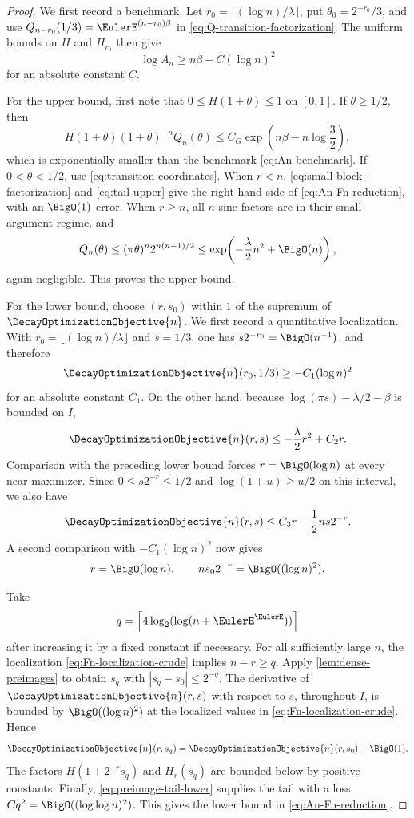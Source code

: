 \documentclass[11pt,oneside]{article}
\theoremstyle{definition}
\theoremstyle{remark}
\begin{document}
\begin{proof}
We first record a benchmark.  Let
\(r_0=\lfloor(\log n)/\lambda\rfloor\), put
\(\theta_0=2^{-r_0}/3\), and use
\(Q_{n-r_0}(1/3)=\EulerE^{(n-r_0)\beta}\) in
\eqref{eq:Q-transition-factorization}.  The uniform bounds on \(H\) and
\(H_{r_0}\) then give
\begin{equation}
 \log A_n\ge n\beta-C(\log n)^2
 \label{eq:An-benchmark}
\end{equation}
for an absolute constant \(C\).

For the upper bound, first note that \(0\le H(1+\theta)\le1\) on
\([0,1]\).  If \(\theta\ge1/2\), then
\[
 H(1+\theta)(1+\theta)^{-n}Q_n(\theta)
 \le C_G\exp\!\left(n\beta-n\log\frac32\right),
\]
which is exponentially smaller than the benchmark \eqref{eq:An-benchmark}.  If
\(0<\theta<1/2\), use \eqref{eq:transition-coordinates}.  When \(r<n\),
\eqref{eq:small-block-factorization} and \eqref{eq:tail-upper} give the
right-hand side of \eqref{eq:An-Fn-reduction}, with an \(\BigO(1)\) error.
When \(r\ge n\), all \(n\) sine factors are in their small-argument regime,
and
\[
 Q_n(\theta)\le(\pi\theta)^n2^{n(n-1)/2}
 \le\exp\!\left(-\frac\lambda2n^2+\BigO(n)\right),
\]
again negligible.  This proves the upper bound.

For the lower bound, choose \((r,s_0)\) within \(1\) of the supremum of
\(\DecayOptimizationObjective{n}\).  We first record a quantitative localization.  With
\(r_0=\lfloor(\log n)/\lambda\rfloor\) and \(s=1/3\), one has
\(s2^{-r_0}=\BigO(n^{-1})\), and therefore
\[
 \DecayOptimizationObjective{n}(r_0,1/3)\ge-C_1(\log n)^2
\]
for an absolute constant \(C_1\).  On the other hand, because
\(\log(\pi s)-\lambda/2-\beta\) is bounded on \(I\),
\[
 \DecayOptimizationObjective{n}(r,s)\le-\frac\lambda2r^2+C_2r.
\]
Comparison with the preceding lower bound forces \(r=\BigO(\log n)\) at every
near-maximizer.  Since \(0\le s2^{-r}\le1/2\) and
\(\log(1+u)\ge u/2\) on this interval, we also have
\[
 \DecayOptimizationObjective{n}(r,s)
 \le C_3r-\frac12ns2^{-r}.
\]
A second comparison with \(-C_1(\log n)^2\) now gives
\begin{equation}
 r=\BigO(\log n),
 \qquad
 n s_0 2^{-r}=\BigO((\log n)^2).
 \label{eq:Fn-localization-crude}
\end{equation}

Take
\[
 q=\left\lceil4\log_2(\log(n+\EulerE^\EulerE))\right\rceil
\]
after increasing it by a fixed constant if necessary.  For all sufficiently large
\(n\), the localization \eqref{eq:Fn-localization-crude} implies
\(n-r\ge q\).  Apply \cref{lem:dense-preimages} to obtain \(s_q\) with
\(|s_q-s_0|\le2^{-q}\).  The derivative of \(\DecayOptimizationObjective{n}(r,s)\) with
respect to \(s\), throughout \(I\), is bounded by \(\BigO((\log n)^2)\) at
the localized values in \eqref{eq:Fn-localization-crude}.  Hence
\[
 \DecayOptimizationObjective{n}(r,s_q)=\DecayOptimizationObjective{n}(r,s_0)+\BigO(1).
\]
The factors \(H(1+2^{-r}s_q)\) and \(H_r(s_q)\) are bounded below by positive
constants.  Finally, \eqref{eq:preimage-tail-lower} supplies the tail with a
loss \(Cq^2=\BigO((\log\log n)^2)\).  This gives the lower bound in
\eqref{eq:An-Fn-reduction}.
\end{proof}
\end{document}
